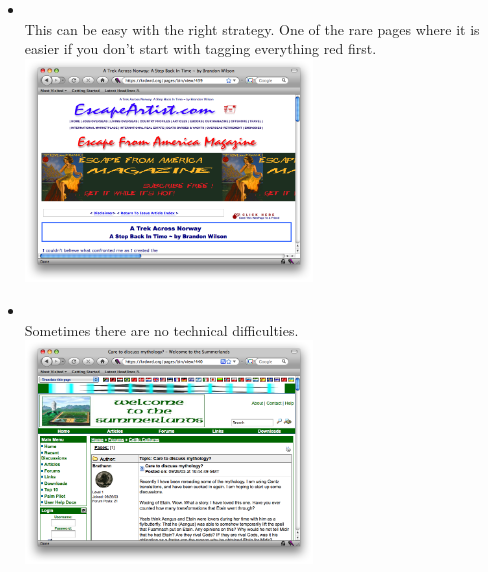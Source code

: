 \documentclass[12pt,a4paper]{article}
\begin{document}
\begin{itemize}
\item {} \\
This can be easy with the right strategy. One of the rare pages where it is easier if you don't start with tagging everything red first. \\
\includegraphics[width=0.6\textwidth]{images/439.png} \\

\item {} \\
Sometimes there are no technical difficulties. \\
\includegraphics[width=0.6\textwidth]{images/440.png} \\

\end{itemize}
\end{document}
